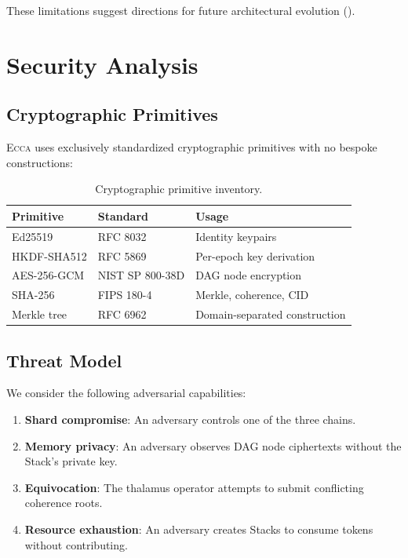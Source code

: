 \documentclass[11pt,twocolumn]{article}
\theoremstyle{definition}
\theoremstyle{plain}
\theoremstyle{remark}
\newcommand{\ecca}{\textsc{Ecca}}
\begin{document}
These limitations suggest directions for future architectural evolution ().

\section{Security Analysis}\label{sec:security}

\subsection{Cryptographic Primitives}

\ecca{} uses exclusively standardized cryptographic primitives with no bespoke constructions:

\begin{table}[H]
\centering
\caption{Cryptographic primitive inventory.}
\label{tab:crypto}
\small
\begin{tabular}{@{}lll@{}}
\toprule
\textbf{Primitive} & \textbf{Standard} & \textbf{Usage}\\
\midrule
Ed25519 & RFC 8032 & Identity keypairs\\
HKDF-SHA512 & RFC 5869 & Per-epoch key derivation\\
AES-256-GCM & NIST SP 800-38D & DAG node encryption\\
SHA-256 & FIPS 180-4 & Merkle, coherence, CID\\
Merkle tree & RFC 6962 & Domain-separated construction\\
\bottomrule
\end{tabular}
\end{table}

\subsection{Threat Model}

We consider the following adversarial capabilities:

\begin{enumerate}[leftmargin=*]
  \item \textbf{Shard compromise}: An adversary controls one of the three chains.
  \item \textbf{Memory privacy}: An adversary observes DAG node ciphertexts without the Stack's private key.
  \item \textbf{Equivocation}: The thalamus operator attempts to submit conflicting coherence roots.
  \item \textbf{Resource exhaustion}: An adversary creates Stacks to consume tokens without contributing.
\end{enumerate}
\end{document}
